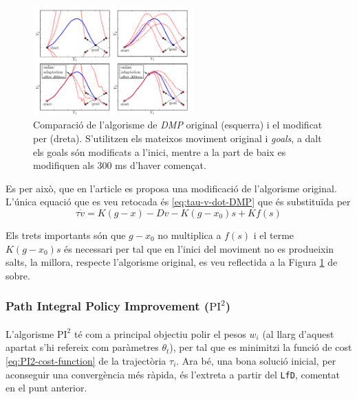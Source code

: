 \documentclass[12pt,a4paper,final,twoside]{article}
\begin{document}
\begin{figure}
\centering
\includegraphics[width=0.55\textwidth]{Imatges/DMP-modified-algorism}
\caption[Comparació de l'algorisme de \textit{DMP} original (esquerra) i el modificat  per \cite{Pastor2009} (dreta)]{Comparació de l'algorisme de \textit{DMP} original (esquerra) i el modificat  per \cite{Pastor2009} (dreta). S'utilitzen els mateixos moviment original i \textit{goals}, a dalt els goals són modificats a l'inici, mentre a la part de baix es modifiquen als 300 ms d'haver començat.}
\label{fig:DMP-modified-algorism}
\end{figure}

Es per això, que en l'article \cite{Pastor2009} es proposa una modificació de l'algorisme original. L'única equació que es veu retocada és \eqref{eq:tau-v-dot-DMP} que és substituïda per
\begin{equation}\label{eq:tau-v-dot-DMP-modified}
\tau \dot{v} = K(g - x) - Dv - K(g - x_0)s + K f(s)
\end{equation}

Els trets importants són que $g - x_0$ no multiplica a $f(s)$ i el terme $K(g - x_0)s$ és necessari per tal que en l'inici del moviment no es produeixin salts, la millora, respecte l'algorisme original, es veu reflectida a la Figura \ref{fig:DMP-modified-algorism} de sobre.


\subsubsection{\textbf{P}ath \textbf{I}ntegral \textbf{P}olicy \textbf{I}mprovement ($\mathrm{PI^2}$)}

\paragraph{}L'algorisme $\mathrm{PI^2}$ \cite{Stulp2011} té com a principal objectiu polir el pesos $w_i$ (al llarg d'aquest apartat s'hi refereix com paràmetres $\theta_t$), per tal que es minimitzi la funció de cost \eqref{eq:PI2-cost-function} de la trajectòria $\tau_i$. Ara bé, una bona solució inicial, per aconseguir una convergència més ràpida, és l'extreta a partir del \texttt{LfD}, comentat en el punt anterior.
\end{document}
